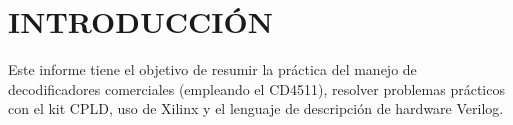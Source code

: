 \section{INTRODUCCIÓN}\sangria{} Este informe tiene el objetivo de resumir la práctica del manejo de decodificadores comerciales (empleando el CD4511), resolver problemas prácticos con el kit CPLD, uso de Xilinx y el lenguaje de descripción de hardware Verilog.
